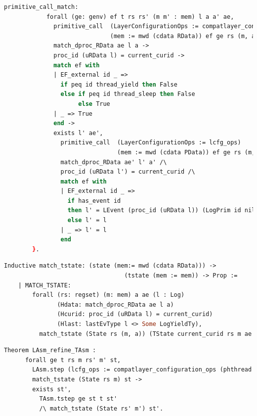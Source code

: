 \begin{lstlisting}[language=Caml]
          primitive_call_match:
            forall (ge: genv) ef t rs rs' (m m' : mem) l a a' ae,
              primitive_call  (LayerConfigurationOps := compatlayer_configuration_ops (phthread <@$\oplus$@> L64))
                              (mem := mwd (cdata RData)) ef ge rs (m, a) t rs' (m', a') ->
              match_dproc_RData ae l a ->
              proc_id (uRData l) = current_curid ->
              match ef with
              | EF_external id _ => 
                if peq id thread_yield then False
                else if peq id thread_sleep then False
                     else True
              | _ => True
              end -> 
              exists l' ae',
                primitive_call  (LayerConfigurationOps := lcfg_ops) 
                                (mem := mwd (cdata PData)) ef ge rs (m, (uRData l, ae)) t rs' (m', (uRData l', ae')) /\
                match_dproc_RData ae' l' a' /\
                proc_id (uRData l') = current_curid /\
                match ef with
                | EF_external id _ => 
                  if has_event id
                  then l' = LEvent (proc_id (uRData l)) (LogPrim id nil 0 (snap_func ae)) :: l
                  else l' = l
                | _ => l' = l
                end
        }.
\end{lstlisting}

\begin{lstlisting}[language=Caml]
    Inductive match_tstate: (state (mem:= mwd (cdata RData))) -> 
                                  (tstate (mem := mem)) -> Prop :=
    | MATCH_TSTATE:
        forall (rs: regset) (m: mem) a ae (l : Log)
               (Hdata: match_dproc_RData ae l a)
               (Hcurid: proc_id (uRData l) = current_curid)
               (Hlast: lastEvType l <> Some LogYieldTy),
          match_tstate (State rs (m, a)) (TState current_curid rs m ae l).
\end{lstlisting}

\begin{lstlisting}[language=Caml]
    Theorem LAsm_refine_TAsm :
      forall ge t rs m rs' m' st, 
        LAsm.step (lcfg_ops := compatlayer_configuration_ops (phthread <@$\oplus$@> L64)) ge (State rs m) t (State rs' m') ->
        match_tstate (State rs m) st ->
        exists st',        
          TAsm.tstep ge st t st'
          /\ match_tstate (State rs' m') st'.
\end{lstlisting}

